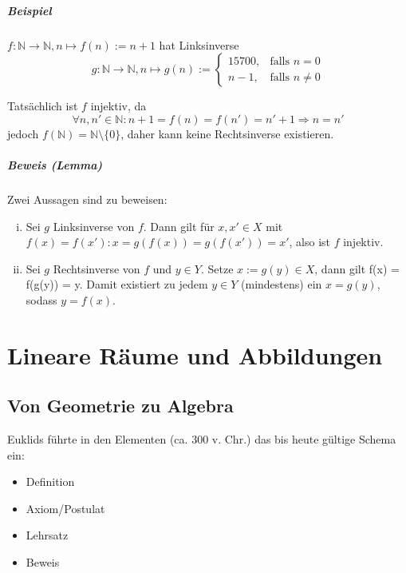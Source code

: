 \documentclass[12pt,a4paper,parskip=half-,DIV=15]{scrreprt}
\begin{document}
\paragraph{Beispiel} $ f:\mathbb{N}\to \mathbb{N}, n\mapsto f(n):= n+1 $ hat Linksinverse
\begin{equation*}
g:\mathbb{N} \to \mathbb{N}, n\mapsto g(n):=
\begin{cases}
15700, & \text{falls } n=0\\
n-1, & \text{falls } n\neq 0
\end{cases}
\end{equation*}

Tatsächlich ist $ f $ injektiv, da
\begin{equation*}
\forall n,n'\in \mathbb{N} : n+1 = f(n) = f(n') = n'+1 \Rightarrow n=n'
\end{equation*}
jedoch $ f(\mathbb{N}) = \mathbb{N}\setminus \{0\} $, daher kann keine Rechtsinverse existieren.

\paragraph{Beweis (Lemma)} Zwei Aussagen sind zu beweisen:
\begin{enumerate}[i)]
\item Sei $ g $ Linksinverse von $ f $. Dann gilt für $ x,x'\in X $ mit \\$ f(x) = f(x'): x = g(f(x)) = g(f(x')) = x' $, also ist $ f $ injektiv.
\item Sei $g $ Rechtsinverse von $ f $ und $ y\in Y $. Setze $ x:= g(y)\in X $, dann gilt f(x) = f(g(y)) = y. Damit existiert zu jedem $ y\in Y $ (mindestens) ein $ x = g(y) $, sodass  $ y=f(x) $.
\end{enumerate}


\chapter{Lineare Räume und Abbildungen}
\section{Von Geometrie zu Algebra}
Euklids führte in den \glqq Elementen\grqq{} (ca. 300 v. Chr.) das bis heute gültige Schema ein:
\begin{itemize}
\item Definition
\item Axiom/Postulat
\item Lehrsatz
\item Beweis
\end{itemize}
\end{document}
